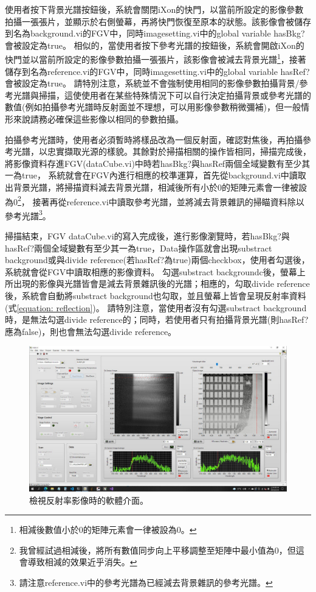 \documentclass[12pt]{article}
\begin{document}
使用者按下背景光譜按鈕後，系統會關閉iXon的快門，以當前所設定的影像參數拍攝一張張片，並顯示於右側螢幕，再將快門恢復至原本的狀態。該影像會被儲存到名為background.vi的FGV中，同時imagesetting.vi中的global variable hasBkg?會被設定為true。
相似的，當使用者按下參考光譜的按鈕後，系統會開啟iXon的快門並以當前所設定的影像參數拍攝一張張片，該影像會被減去背景光譜\footnote{相減後數值小於0的矩陣元素會一律被設為0。}，接著儲存到名為reference.vi的FGV中，同時imagesetting.vi中的global variable hasRef?會被設定為true。
請特別注意，系統並不會強制使用相同的影像參數拍攝背景/參考光譜與掃描，這使使用者在某些特殊情況下可以自行決定拍攝背景或參考光譜的數值(例如拍攝參考光譜時反射面並不理想，可以用影像參數稍微彌補)，但一般情形來說請務必確保這些影像以相同的參數拍攝。

拍攝參考光譜時，使用者必須暫時將樣品改為一個反射面，確認對焦後，再拍攝參考光譜，以忠實擷取光源的樣貌。其餘對於掃描相關的操作皆相同，掃描完成後，將影像資料存進FGV(dataCube.vi)中時若hasBkg?與hasRef兩個全域變數有至少其一為true，
系統就會在FGV內進行相應的校準運算，首先從background.vi中讀取出背景光譜，將掃描資料減去背景光譜，相減後所有小於0的矩陣元素會一律被設為0\footnote{我曾經試過相減後，將所有數值同步向上平移調整至矩陣中最小值為0，但這會導致相減的效果近乎消失。}，
接著再從reference.vi中讀取參考光譜，並將減去背景雜訊的掃瞄資料除以參考光譜\footnote{請注意reference.vi中的參考光譜為已經減去背景雜訊的參考光譜。}。

掃描結束，FGV dataCube.vi的寫入完成後，進行影像瀏覽時，若hasBkg?與hasRef?兩個全域變數有至少其一為true，Data操作區就會出現substract background或與divide reference(若hasRef?為true)兩個checkbox，使用者勾選後，系統就會從FGV中讀取相應的影像資料。
勾選substract backgroundc後，螢幕上所出現的影像與光譜皆會是減去背景雜訊後的光譜；相應的，勾取divide reference後，系統會自動將substract background也勾取，並且螢幕上皆會呈現反射率資料(式\ref{equation: reflection})。
請特別注意，當使用者沒有勾選substract background時，是無法勾選divide reference的；同時，若使用者只有拍攝背景光譜(則hasRef?應為false)，則也會無法勾選divide reference。
\begin{figure}[ht]
    \centering
    \includegraphics[width=\linewidth]{reflection.jpeg}
    \caption{檢視反射率影像時的軟體介面。}
    \label{figure: reflection}
\end{figure}
\end{document}
